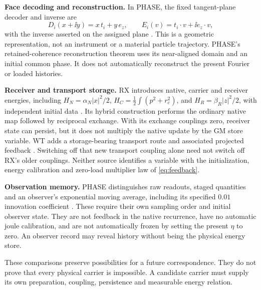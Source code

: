 \textbf{Face decoding and reconstruction.} In PHASE, the fixed tangent-plane decoder and inverse are
\[
 D_i(x+\ii y)=x\,t_i+y\,e_z,\qquad
 E_i(v)=t_i\cdot v+\ii e_z\cdot v,
\]
with the inverse asserted on the assigned plane \cite{PHASE}. This is a geometric representation, not an instrument or a material particle trajectory. PHASE's retained-coherence reconstruction theorem uses its near-aligned domain and an initial common phase. It does not automatically reconstruct the present Fourier or loaded histories.

\textbf{Receiver and transport storage.} RX introduces native, carrier and receiver energies, including \(H_N=\alpha_N|x|^2/2\), \(H_C=\frac12\int(p^2+r_c^2)\), and \(H_R=\beta_R|z|^2/2\), with independent initial data \cite{RX}. Its hybrid construction performs the ordinary native map followed by reciprocal exchange. With its exchange couplings zero, receiver state can persist, but it does not multiply the native update by the GM store variable. WT adds a storage-bearing transport route and associated projected feedback \cite{WT}. Switching off that new transport coupling alone need not switch off RX's older couplings. Neither source identifies a variable with the initialization, energy calibration and zero-load multiplier law of \eqref{eq:feedback}.

\textbf{Observation memory.} PHASE distinguishes raw readouts, staged quantities and an observer's exponential moving average, including its specified \(0.01\) innovation coefficient \cite{PHASE}. These require their own sampling order and initial observer state. They are not feedback in the native recurrence, have no automatic joule calibration, and are not automatically frozen by setting the present \(\eta\) to zero. An observer record may reveal history without being the physical energy store.

These comparisons preserve possibilities for a future correspondence. They do not prove that every physical carrier is impossible. A candidate carrier must supply its own preparation, coupling, persistence and measurable energy relation.

